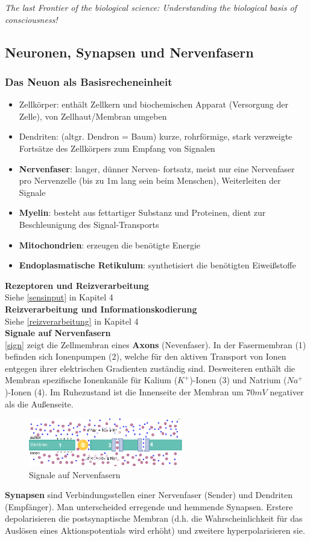 \emph{The last Frontier of the biological science: Understanding the biological basis of consciousness!}
\subsection{Neuronen, Synapsen und Nervenfasern}
\subsubsection{Das Neuon als Basisrecheneinheit}
\begin{itemize}
\item Zellkörper: enthält Zellkern und biochemischen Apparat (Versorgung der Zelle), von Zellhaut/Membran umgeben
\item Dendriten: (altgr. Dendron = \glqq Baum\grqq) kurze, rohrförmige, stark verzweigte Fortsätze des Zellkörpers zum Empfang von Signalen
\item \textbf{Nervenfaser}: langer, dünner Nerven-
fortsatz, meist nur eine Nervenfaser pro
Nervenzelle (bis zu 1m lang sein beim
Menschen), Weiterleiten der Signale
\item \textbf{Myelin}: besteht aus fettartiger Substanz und Proteinen,
dient zur Beschleunigung des Signal-Transports
\item \textbf{Mitochondrien}: erzeugen die benötigte Energie
\item \textbf{Endoplasmatische Retikulum}: synthetisiert die benötigten Eiweißstoffe
\end{itemize}
\textbf{Rezeptoren und Reizverarbeitung}\\
Siehe \autoref{sensinput} in Kapitel 4\\
\textbf{Reizverarbeitung und Informationskodierung}\\
Siehe \autoref{reizverarbeitung} in Kapitel 4\\
\noindent
\textbf{Signale auf Nervenfasern}\\
\autoref{sign} zeigt die Zellmembran eines \textbf{Axons} (Nevenfaser). In der Fasermembran (1) befinden sich Ionenpumpen (2), welche für den aktiven Transport von Ionen entgegen ihrer elektrischen Gradienten zuständig sind. Desweiteren enthält die Membran spezifische Ionenkanäle für Kalium ($K^+$)-Ionen (3) und Natrium ($Na^+$)-Ionen (4). Im Ruhezustand ist die Innenseite der Membran um $70mV$ negativer als die Außenseite.
\begin{figure}[h!]
	\centering
	\includegraphics[width=0.6\textwidth]{figures/ch07_signale.png}
	\caption{Signale auf Nervenfasern}
	\label{sign}
\end{figure}
\noindent
\textbf{Synapsen} sind Verbindungsstellen einer Nervenfaser (Sender) und Dendriten (Empfänger). Man unterscheided erregende und hemmende Synapsen. Erstere depolarisieren die postsynaptische Membran (d.h. die Wahrscheinlichkeit für das Auslösen eines Aktionspotentials wird erhöht) und zweitere hyperpolarisieren sie.

